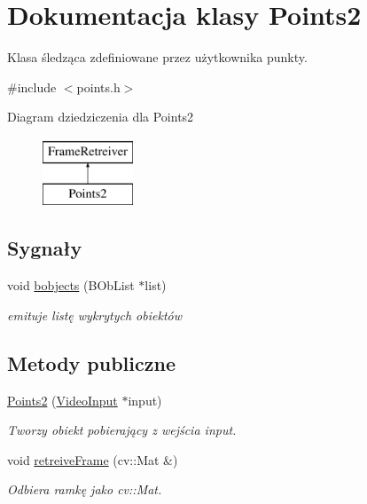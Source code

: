 \hypertarget{class_points2}{
\section{Dokumentacja klasy Points2}
\label{class_points2}
}


Klasa śledząca zdefiniowane przez użytkownika punkty.  




{\ttfamily \#include $<$points.h$>$}

Diagram dziedziczenia dla Points2\begin{figure}[H]
\begin{center}
\leavevmode
\includegraphics[height=2cm]{class_points2}
\end{center}
\end{figure}
\subsection*{Sygnały}
\begin{DoxyCompactItemize}
\item 
\hypertarget{class_points2_a40606e5bff8ad0c1fc1887669d6e8e6e}{
void \hyperlink{class_points2_a40606e5bff8ad0c1fc1887669d6e8e6e}{bobjects} (BObList $\ast$list)}
\label{class_points2_a40606e5bff8ad0c1fc1887669d6e8e6e}

\begin{DoxyCompactList}\small\item\em emituje listę wykrytych obiektów \item\end{DoxyCompactList}\end{DoxyCompactItemize}
\subsection*{Metody publiczne}
\begin{DoxyCompactItemize}
\item 
\hypertarget{class_points2_a8ae4636b6fcd263753884959bb7d9ede}{
\hyperlink{class_points2_a8ae4636b6fcd263753884959bb7d9ede}{Points2} (\hyperlink{class_video_input}{VideoInput} $\ast$input)}
\label{class_points2_a8ae4636b6fcd263753884959bb7d9ede}

\begin{DoxyCompactList}\small\item\em Tworzy obiekt pobierający z wejścia input. \item\end{DoxyCompactList}\item 
void \hyperlink{class_points2_af46dd0cd21f73b3214d5f766349b8450}{retreiveFrame} (cv::Mat \&)
\begin{DoxyCompactList}\small\item\em Odbiera ramkę jako cv::Mat. \item\end{DoxyCompactList}\end{DoxyCompactItemize}
